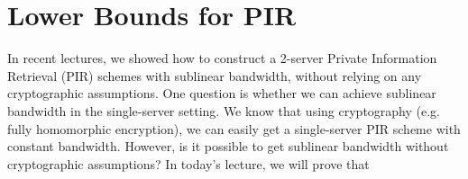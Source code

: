 
\newcommand{\bits}{\{0,1\}}
\newcommand{\bfu}{\mathbf{u}}
\newcommand{\bfv}{\mathbf{v}}
\newcommand{\bfp}{\mathbf{p}}
\newcommand{\bfz}{\mathbf{z}}
\newcommand{\bfx}{\mathbf{x}}
\newcommand{\bfy}{\mathbf{y}}

\newcommand{\calR}{\mathcal{R}}
\newcommand{\FHE}{\ensuremath{{\sf FHE}}}
\newcommand{\Gen}{\ensuremath{{\sf Gen}}}
\newcommand{\Eval}{\ensuremath{{\sf Eval}}}
\newcommand{\Enc}{\ensuremath{{\sf Enc}}}
\newcommand{\Dec}{\ensuremath{{\sf Dec}}}
\newcommand{\DB}{\ensuremath{{\sf DB}}}

\newcommand{\CNextMsg}{\ensuremath{{\sf C Next Msg}}}
\newcommand{\SNextMsg}{\ensuremath{{\sf S Next Msg}}}
\newcommand{\CNext}{\ensuremath{{\sf C Next}}}
\newcommand{\SNext}{\ensuremath{{\sf S Next}}}
\newcommand{\Cstp}{\ensuremath{{\sf Cst'}}}
\newcommand{\Cst}{\ensuremath{{\sf Cst}}}
\newcommand{\msg}{\ensuremath{{\sf msg}}}
\newcommand{\msgp}{\ensuremath{{\sf msg'}}}
\newcommand{\Coutput}{\ensuremath{{\sf Reconstr}}}
\newcommand{\ans}{\ensuremath{{\sf ans}}}
\newcommand{\Ccoins}{\ensuremath{{\sf Ccoins}}}
\newcommand{\Scoins}{\ensuremath{{\sf Scoins}}}
\newcommand{\Comm}{\ensuremath{{\sf Comm}}}
\newcommand{\Expt}{\ensuremath{{\sf Expt}}}
\newcommand{\coin}{\ensuremath{{\sf coin}}}
\newcommand{\View}{\ensuremath{{\sf View}}}
\newcommand{\negl}{\ensuremath{{\sf negl}}}
\newcommand{\PPT}{PPT }
\newcommand{\Out}{\ensuremath{{\sf Out}}}
\newcommand{\OWF}{\ensuremath{{\sf OWF}}}
\newcommand{\OT}{\ensuremath{{\sf OT}}}
\newcommand{\PIR}{\ensuremath{{\sf PIR}}}
\newcommand{\Server}{\ensuremath{{\sf Server}}}
\newcommand{\Client}{\ensuremath{{\sf Client}}}
\newcommand{\Alice}{\ensuremath{{\sf Alice}}}
\newcommand{\Bob}{\ensuremath{{\sf Bob}}}
\newcommand{\getr}{\ensuremath{~{\overset{\$}{\leftarrow}}}~}
\newcommand{\get}{\ensuremath{\leftarrow}}
\newcommand{\E}{\ensuremath{{\bf E}}}
\newcommand{\out}{\ensuremath{{\sf out}}}

\newcommand{\ignore}[1]{}



\section{Lower Bounds for PIR}

In recent lectures, we showed how to construct a 2-server Private Information Retrieval (PIR) schemes with sublinear bandwidth, without relying on any cryptographic assumptions. 
One question is whether we can achieve sublinear bandwidth in the single-server setting.
We know that using cryptography (e.g. fully homomorphic encryption), we can 
easily get a single-server PIR scheme with constant bandwidth. 
However, is it possible to get sublinear bandwidth without cryptographic assumptions?
In today's lecture, we will prove that 

